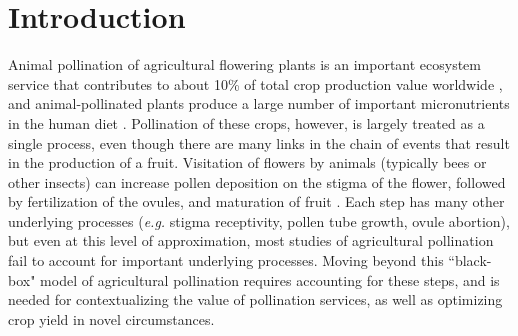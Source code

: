 \documentclass[12pt]{article} %
\begin{document}
\section*{Introduction}
Animal pollination of agricultural flowering plants is an important ecosystem service that contributes to about 10\% of total crop production value worldwide \citep{gallai2009}, and animal-pollinated plants produce a large number of important micronutrients in the human diet \citep{eilers2011}.
Pollination of these crops, however, is largely treated as a single process, even though there are many links in the chain of events that result in the production of a fruit.
Visitation of flowers by animals (typically bees or other insects) can increase pollen deposition on the stigma of the flower, followed by fertilization of the ovules, and maturation of fruit \citep{erbar2003, goldberg1994}.
Each step has many other underlying processes (\textit{e.g.} stigma receptivity, pollen tube growth, ovule abortion), but even at this level of approximation, most studies of agricultural pollination fail to account for important underlying processes.
Moving beyond this ``black-box" model of agricultural pollination requires accounting for these steps, and is needed for contextualizing the value of pollination services, as well as optimizing crop yield in novel circumstances.



\end{document}
